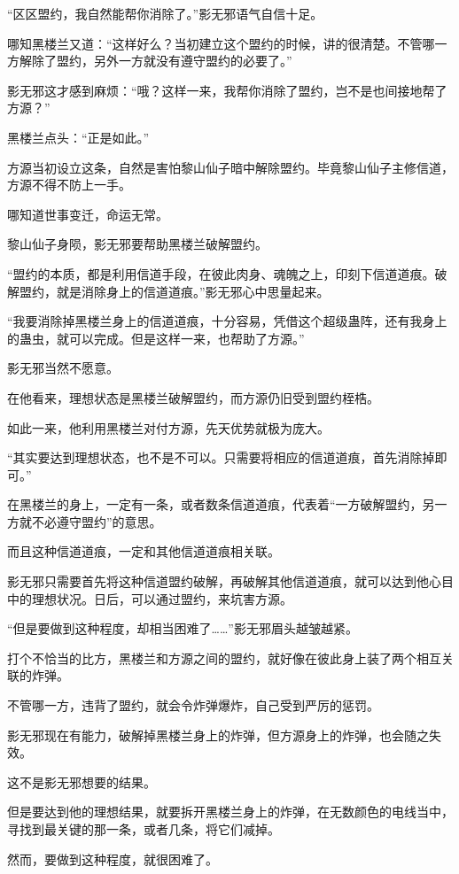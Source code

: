\begin{this_body}
“区区盟约，我自然能帮你消除了。”影无邪语气自信十足。

哪知黑楼兰又道：“这样好么？当初建立这个盟约的时候，讲的很清楚。不管哪一方解除了盟约，另外一方就没有遵守盟约的必要了。”

影无邪这才感到麻烦：“哦？这样一来，我帮你消除了盟约，岂不是也间接地帮了方源？”

黑楼兰点头：“正是如此。”

方源当初设立这条，自然是害怕黎山仙子暗中解除盟约。毕竟黎山仙子主修信道，方源不得不防上一手。

哪知道世事变迁，命运无常。

黎山仙子身陨，影无邪要帮助黑楼兰破解盟约。

“盟约的本质，都是利用信道手段，在彼此肉身、魂魄之上，印刻下信道道痕。破解盟约，就是消除身上的信道道痕。”影无邪心中思量起来。

“我要消除掉黑楼兰身上的信道道痕，十分容易，凭借这个超级蛊阵，还有我身上的蛊虫，就可以完成。但是这样一来，也帮助了方源。”

影无邪当然不愿意。

在他看来，理想状态是黑楼兰破解盟约，而方源仍旧受到盟约桎梏。

如此一来，他利用黑楼兰对付方源，先天优势就极为庞大。

“其实要达到理想状态，也不是不可以。只需要将相应的信道道痕，首先消除掉即可。”

在黑楼兰的身上，一定有一条，或者数条信道道痕，代表着“一方破解盟约，另一方就不必遵守盟约”的意思。

而且这种信道道痕，一定和其他信道道痕相关联。

影无邪只需要首先将这种信道盟约破解，再破解其他信道道痕，就可以达到他心目中的理想状况。日后，可以通过盟约，来坑害方源。

“但是要做到这种程度，却相当困难了……”影无邪眉头越皱越紧。

打个不恰当的比方，黑楼兰和方源之间的盟约，就好像在彼此身上装了两个相互关联的炸弹。

不管哪一方，违背了盟约，就会令炸弹爆炸，自己受到严厉的惩罚。

影无邪现在有能力，破解掉黑楼兰身上的炸弹，但方源身上的炸弹，也会随之失效。

这不是影无邪想要的结果。

但是要达到他的理想结果，就要拆开黑楼兰身上的炸弹，在无数颜色的电线当中，寻找到最关键的那一条，或者几条，将它们减掉。

然而，要做到这种程度，就很困难了。


\end{this_body}
